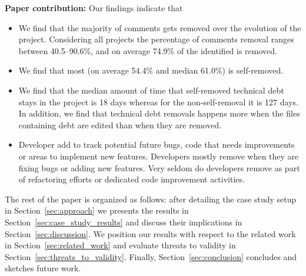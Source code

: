 \textbf{Paper contribution:} Our findings indicate that 
\begin{itemize}
	\item We find that the majority of \SATD comments gets removed over the evolution of the project. Considering all projects the percentage of \SATD comments removal ranges between 40.5--90.6\%, and on average 74.9\% of the identified \SATD is removed.
	\item We find that most \SATD (on average 54.4\% and median 61.0\%) is self-removed.
	\item We find that the median amount of time that self-removed technical debt stays in the project is 18 days whereas for the non-self-removal it is 127 days. In addition, we find that technical debt removals happens more when the files containing debt are edited than when they are removed.
	\item Developer add \SATD to track potential future bugs, code that needs improvements or areas to implement new features. Developers mostly remove \SATD when they are fixing bugs or adding new features. Very seldom do developers remove \SATD as part of refactoring efforts or dedicated code improvement activities.
\end{itemize}





The rest of the paper is organized as follows: after detailing the case study setup in Section~\ref{sec:approach} we presents the results in Section~\ref{sec:case_study_results} and discuss their implications in Section~\ref{sec:discussion}. We position our results with respect to the related work in Section~\ref{sec:related_work} and evaluate threats to validity in Section~\ref{sec:threats_to_validity}. Finally, Section~\ref{sec:conclusion} concludes and sketches future work.





